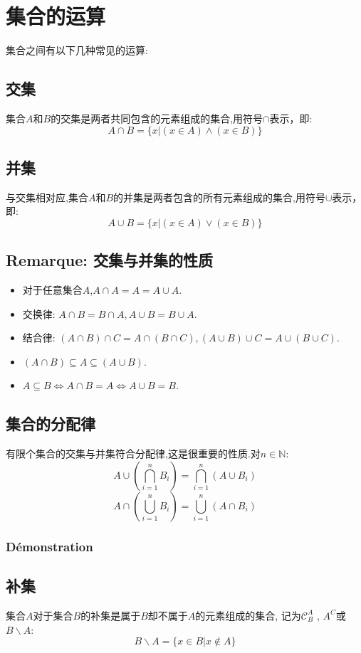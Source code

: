 \documentclass[12pt, a4paper, oneside]{ctexbook}
\begin{document}
\section{集合的运算}
  集合之间有以下几种常见的运算:
  \subsection{交集}
  集合$A$和$B$的交集是两者共同包含的元素组成的集合,用符号$\cap$表示，即:
  $$
  A\cap B=\{x | (x\in A)\land (x\in B)\}
  $$


  \subsection{并集}
  与交集相对应,集合$A$和$B$的并集是两者包含的所有元素组成的集合,用符号$\cup$表示，即:
  $$
  A\cup B=\{x | (x\in A)\lor (x\in B)\}
  $$

  \subsection{Remarque: 交集与并集的性质}
  \begin{itemize}
    \item 对于任意集合$A$,$A\cap A=A=A\cup A$.
    \item 交换律: $A\cap B=B\cap A,A\cup B=B\cup A$.
    \item 结合律: $(A\cap B)\cap C=A\cap (B\cap C),(A\cup B)\cup C=A\cup (B\cup C)$.
    \item $(A\cap B)\subseteq A\subseteq (A\cup B).$
    \item $A\subseteq B\Leftrightarrow A\cap B=A\Leftrightarrow A\cup B=B$.
  \end{itemize}
  \subsection{集合的分配律}
  有限个集合的交集与并集符合分配律,这是很重要的性质.对$n\in\mathbb{N}$:
  $$
  A\cup(\bigcap_{i=1}^{n}B_i)=\bigcap_{i=1}^{n}(A\cup B_i)
  $$
  $$
  A\cap(\bigcup_{i=1}^{n}B_i)=\bigcup_{i=1}^{n}(A\cap B_i)
  $$
  \subsubsection{Démonstration}
  \subsection{补集 }
  集合$A$对于集合$B$的补集是属于$B$却不属于$A$的元素组成的集合,
  记为$ \mathcal{C}_B^A$ , $A^C$或$B\backslash A$:
  $$
  B\backslash A=\{x\in B | x\notin A\}
  $$
\end{document}
